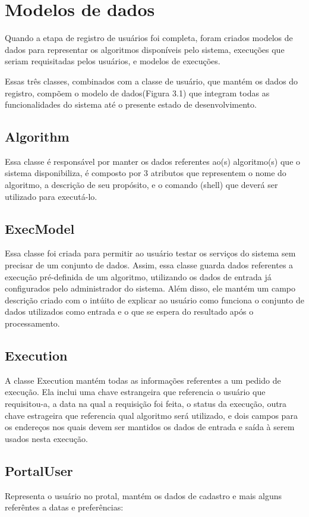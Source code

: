 \documentclass[tg]{mdtufsm}
\begin{document}
\section{Modelos de dados}
Quando a etapa de registro de usuários foi completa, foram criados modelos de dados para representar os algoritmos disponíveis pelo sistema, execuções que seriam requisitadas pelos usuários, e modelos de execuções.

Essas três classes, combinados com a classe de usuário, que mantém os dados do registro, compõem o modelo de dados(Figura 3.1) que integram todas as funcionalidades do sistema até o presente estado de desenvolvimento.

\subsection{Algorithm}
Essa classe é responsável por manter os dados referentes ao(s) algoritmo(s) que o sistema disponibiliza, é composto por 3 atributos que representem o nome do algoritmo, a descrição de seu propósito, e o comando (shell) que deverá ser utilizado para executá-lo.

\subsection{ExecModel}
Essa classe foi criada para permitir ao usuário testar os serviços do sistema sem precisar de um conjunto de dados. Assim, essa classe guarda dados referentes a execução pré-definida de um algoritmo, utilizando os dados de entrada já configurados pelo administrador do sistema. Além disso, ele mantém um campo descrição criado com o intúito de explicar ao usuário como funciona o conjunto de dados utilizados como entrada e o que se espera do resultado após o processamento.

\subsection{Execution}
A classe Execution mantém todas as informações referentes a um pedido de execução. Ela inclui uma chave estrangeira que referencia o usuário que requisitou-a, a data na qual a requisição foi feita, o status da execução, outra chave estrageira que referencia qual algoritmo será utilizado, e dois campos para os endereços nos quais devem ser mantidos os dados de entrada e saída à serem usados nesta execução.

\subsection{PortalUser}
Representa o usuário no protal, mantém os dados de cadastro e mais alguns referêntes a datas e preferências:
\end{document}
